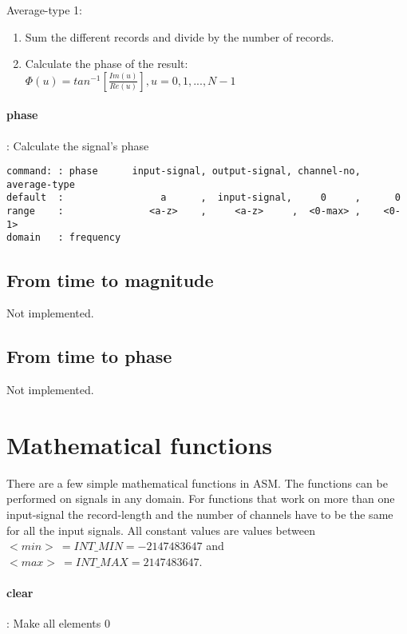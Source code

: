 \documentclass{report}
\newcommand{\bc}{\scriptsize}
\newcommand{\ec}{\normalsize}
\begin{document}
Average-type 1:

\begin{enumerate}
\item Sum the different records and divide by the number of records.
\item Calculate the phase of the result:\\
   \( \Phi(u) = tan^{-1}\left[ \frac{Im(u)}{Re(u)}\right],  u = 0, 1, ..., N-1 \)
\end{enumerate}
\ec
\paragraph{phase}: Calculate the signal's phase

\bc
\begin{verbatim}
command: : phase      input-signal, output-signal, channel-no, average-type
default  :                 a      ,  input-signal,     0     ,      0
range    :               <a-z>    ,     <a-z>     ,  <0-max> ,    <0-1>
domain   : frequency
\end{verbatim}
\ec

\subsection{From time to magnitude}

Not implemented.

\subsection{From time to phase}

Not implemented.

\section{Mathematical functions}

There are a few simple mathematical functions in ASM. The functions
can be performed on signals in any domain. For functions that work
on more than one input-signal the record-length and the number of
channels have to be the same for all the input signals. All
constant values are values between $<min> ~ = INT\_MIN = -2147483647 $
and $ <max> ~ = INT\_MAX = 2147483647 $.

\paragraph{clear}: Make all elements 0
\end{document}
